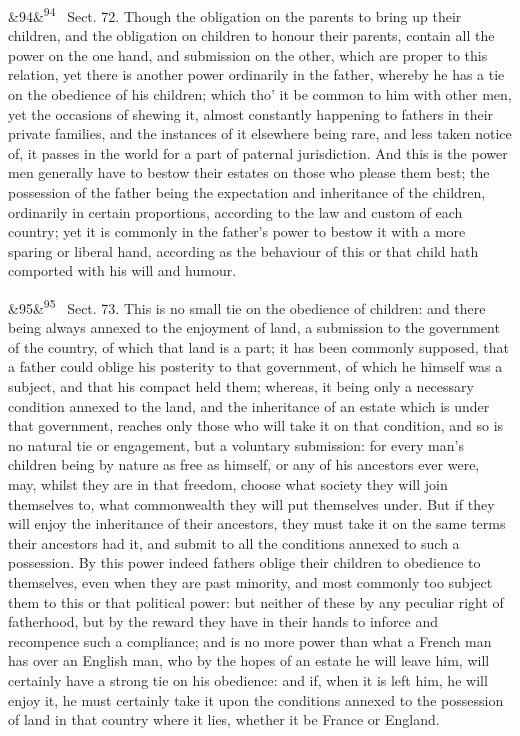 \documentclass[12pt]{article}
\newcommand{\para}[1][]{\par\noindent\ifx&#1&\else\textsuperscript{\footnotesize #1}~\fi}
\begin{document}
\para[94] Sect. 72. Though the obligation on the parents to bring up their children, and the obligation on children to honour their parents, contain all the power on the one hand, and submission on the other, which are proper to this relation, yet there is another power ordinarily in the father, whereby he has a tie on the obedience of his children; which tho' it be common to him with other men, yet the occasions of shewing it, almost constantly happening to fathers in their private families, and the instances of it elsewhere being rare, and less taken notice of, it passes in the world for a part of paternal jurisdiction. And this is the power men generally have to bestow their estates on those who please them best; the possession of the father being the expectation and inheritance of the children, ordinarily in certain proportions, according to the law and custom of each country; yet it is commonly in the father's power to bestow it with a more sparing or liberal hand, according as the behaviour of this or that child hath comported with his will and humour.

\para[95] Sect. 73. This is no small tie on the obedience of children: and there being always annexed to the enjoyment of land, a submission to the government of the country, of which that land is a part; it has been commonly supposed, that a father could oblige his posterity to that government, of which he himself was a subject, and that his compact held them; whereas, it being only a necessary condition annexed to the land, and the inheritance of an estate which is under that government, reaches only those who will take it on that condition, and so is no natural tie or engagement, but a voluntary submission: for every man's children being by nature as free as himself, or any of his ancestors ever were, may, whilst they are in that freedom, choose what society they will join themselves to, what commonwealth they will put themselves under. But if they will enjoy the inheritance of their ancestors, they must take it on the same terms their ancestors had it, and submit to all the conditions annexed to such a possession. By this power indeed fathers oblige their children to obedience to themselves, even when they are past minority, and most commonly too subject them to this or that political power: but neither of these by any peculiar right of fatherhood, but by the reward they have in their hands to inforce and recompence such a compliance; and is no more power than what a French man has over an English man, who by the hopes of an estate he will leave him, will certainly have a strong tie on his obedience: and if, when it is left him, he will enjoy it, he must certainly take it upon the conditions annexed to the possession of land in that country where it lies, whether it be France or England.
\end{document}
